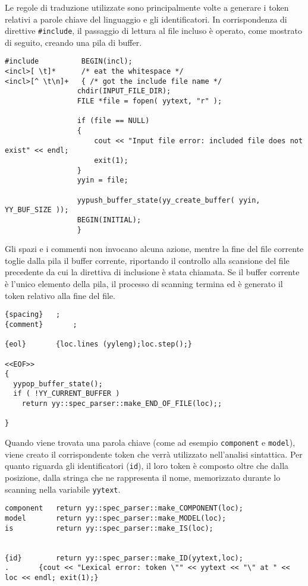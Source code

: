 Le regole di traduzione utilizzate sono principalmente volte a generare i token relativi a parole chiave del linguaggio e gli identificatori.
In corrispondenza di direttive \verb|#include|, il passaggio di lettura al file incluso è operato, come mostrato di seguito, creando una pila di buffer. 
\begin{verbatim}
#include          BEGIN(incl);
<incl>[ \t]*      /* eat the whitespace */
<incl>[^ \t\n]+   { /* got the include file name */
                 chdir(INPUT_FILE_DIR);
                 FILE *file = fopen( yytext, "r" );

                 if (file == NULL)
                 {
                     cout << "Input file error: included file does not exist" << endl;
                     exit(1);
                 }
                 yyin = file;

                 yypush_buffer_state(yy_create_buffer( yyin, YY_BUF_SIZE ));
                 BEGIN(INITIAL);
                 }
\end{verbatim}

Gli spazi e i commenti non invocano alcuna azione, mentre la fine del file corrente toglie dalla pila il buffer corrente, riportando il controllo alla scansione del file precedente da cui la direttiva di inclusione è stata chiamata. Se il buffer corrente è l'unico elemento della pila, il processo di scanning termina ed è generato il token relativo alla fine del file.
\begin{verbatim}
{spacing}	;
{comment}       ;

{eol}		{loc.lines (yyleng);loc.step();}

<<EOF>>    
{
  yypop_buffer_state();
  if ( !YY_CURRENT_BUFFER )
    return yy::spec_parser::make_END_OF_FILE(loc);;
  
}
\end{verbatim}
Quando viene trovata una parola chiave (come ad esempio \verb|component| e \verb|model|), viene creato il corrispondente token che verrà utilizzato nell'analisi sintattica.
Per quanto riguarda gli identificatori (\verb|id|), il loro token è composto oltre che dalla posizione, dalla stringa che ne rappresenta il nome, memorizzato durante lo scanning nella variabile \verb|yytext|.
\begin{verbatim}
component   return yy::spec_parser::make_COMPONENT(loc);
model       return yy::spec_parser::make_MODEL(loc);
is          return yy::spec_parser::make_IS(loc);


{id}        return yy::spec_parser::make_ID(yytext,loc);
.		{cout << "Lexical error: token \"" << yytext << "\" at " << loc << endl; exit(1);}
\end{verbatim}


